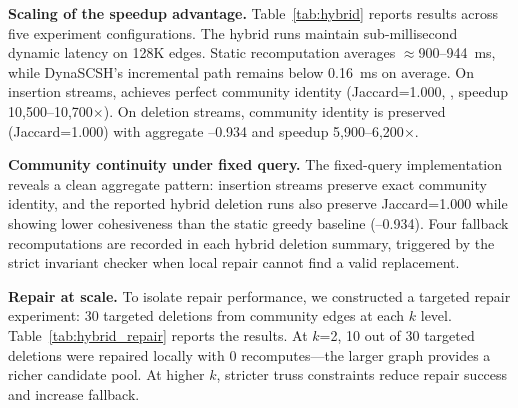 \textbf{Scaling of the speedup advantage.} Table~\ref{tab:hybrid} reports results across five experiment configurations. The hybrid runs maintain sub-millisecond dynamic latency on 128K edges. Static recomputation averages $\approx$900--944~ms, while DynaSCSH's incremental path remains below 0.16~ms on average. On insertion streams, \DynaSCSH achieves perfect community identity (Jaccard=1.000, , speedup 10,500--10,700$\times$). On deletion streams, community identity is preserved (Jaccard=1.000) with aggregate --0.934 and speedup 5,900--6,200$\times$.

\begin{table}[htbp]
\centering
\caption{Hybrid graph results under fixed-query implementation (26,850 nodes, 128,227 edges).}
\label{tab:hybrid}
\end{table}

\textbf{Community continuity under fixed query.} The fixed-query implementation reveals a clean aggregate pattern: insertion streams preserve exact community identity, and the reported hybrid deletion runs also preserve Jaccard=1.000 while showing lower cohesiveness than the static greedy baseline (--0.934). Four fallback recomputations are recorded in each hybrid deletion summary, triggered by the strict invariant checker when local repair cannot find a valid replacement.

\textbf{Repair at scale.} To isolate repair performance, we constructed a targeted repair experiment: 30 targeted deletions from community edges at each $k$ level. Table~\ref{tab:hybrid_repair} reports the results. At $k$=2, 10 out of 30 targeted deletions were repaired locally with 0 recomputes---the larger graph provides a richer candidate pool. At higher $k$, stricter truss constraints reduce repair success and increase fallback.

